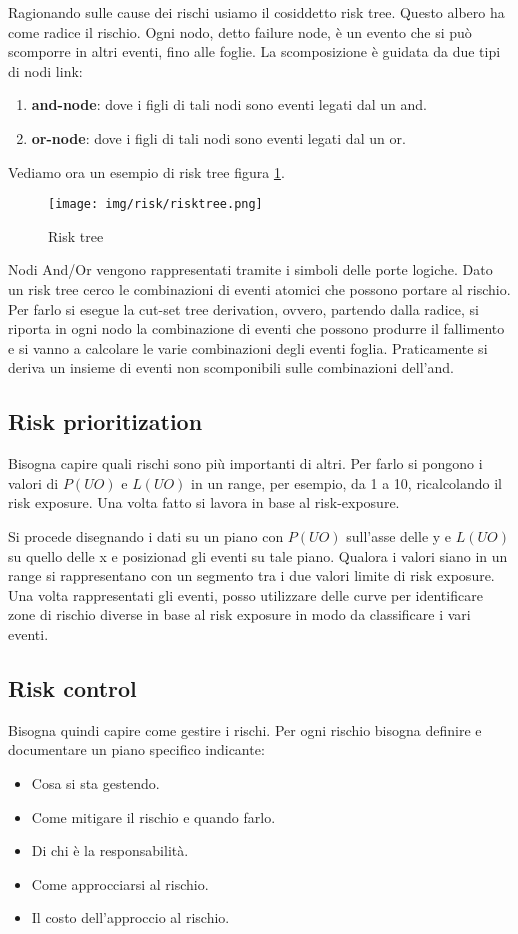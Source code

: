 Ragionando sulle cause dei rischi usiamo il cosiddetto risk tree. Questo albero
ha come radice il rischio. Ogni nodo, detto failure node, è un evento che si può
scomporre in altri eventi, fino alle foglie. La scomposizione è guidata da due
tipi di nodi link:
\begin{enumerate}
    \item \textbf{and-node}: dove i figli di tali nodi sono eventi legati dal un and.
    \item \textbf{or-node}: dove i figli di tali nodi sono eventi legati dal un or.
\end{enumerate}
\begin{esempio}
    Vediamo ora un esempio di risk tree figura \ref{fig:risk-tree}.
    \begin{figure}[!ht]
        \centering
        \texttt{[image: img/risk/risktree.png]}
        \caption{Risk tree}
        \label{fig:risk-tree}
    \end{figure}
\end{esempio}
Nodi And/Or vengono rappresentati tramite i simboli delle porte logiche. Dato un
risk tree cerco le combinazioni di eventi atomici che possono portare al rischio.
Per farlo si esegue la cut-set tree derivation, ovvero, partendo dalla radice, si
riporta in ogni nodo la combinazione di eventi che possono produrre il fallimento
e si vanno a calcolare le varie combinazioni degli eventi foglia. Praticamente si
deriva un insieme di eventi non scomponibili sulle combinazioni dell'and.
\subsection{Risk prioritization}
Bisogna capire quali rischi sono più importanti di altri. Per farlo si pongono i
valori di $P(UO)$ e $L(UO)$ in un range, per esempio, da 1 a 10, ricalcolando il
risk exposure. Una volta fatto si lavora in base al risk-exposure.

Si procede disegnando i dati su un piano con $P(UO)$ sull'asse delle y e $L(UO)$
su quello delle x e posizionad gli eventi su tale piano. Qualora i valori siano
in un range si rappresentano con un segmento tra i due valori limite di risk exposure.
Una volta rappresentati gli eventi, posso utilizzare delle curve per identificare
zone di rischio diverse in base al risk exposure in modo da classificare i vari eventi.
\subsection{Risk control}
Bisogna quindi capire come gestire i rischi. Per ogni rischio bisogna definire e
documentare un piano specifico indicante:
\begin{itemize}
    \item Cosa si sta gestendo.
    \item Come mitigare il rischio e quando farlo.
    \item Di chi è la responsabilità.
    \item Come approcciarsi al rischio.
    \item Il costo dell'approccio al rischio.
\end{itemize}

